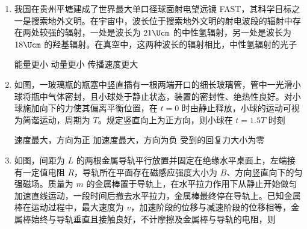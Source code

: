 \documentclass[\gkver]{gaokaozhenti}
\begin{document}
\begin{enumerate}
\item
我国在贵州平塘建成了世界最大单口径球面射电望远镜 FAST，其科学目标之一是搜索地外文明。在宇宙中，波长位于搜索地外文明的射电波段的辐射中存在两处较强的辐射，一处是波长为 $21 \Ucm$ 的中性氢辐射，另一处是波长为 $18 \Ucm$ 的羟基辐射。在真空中，这两种波长的辐射相比，中性氢辐射的光子

{能量更小}
{动量更小}
{传播速度更大}


\item
如图，一玻璃瓶的瓶塞中竖直插有一根两端开口的细长玻璃管，管中一光滑小球将瓶中气体密封，且小球处于静止状态，装置的密封性、绝热性良好。对小球施加向下的力使其偏离平衡位置，在 $t = 0$ 时由静止释放，小球的运动可视为简谐运动，周期为 $T$。规定竖直向上为正方向，则小球在 $t = 1.5T$ 时刻


{速度最大，方向为正}
{加速度最大，方向为负}
{受到的回复力大小为零}


\item
如图，间距为 $L$ 的两根金属导轨平行放置并固定在绝缘水平桌面上，左端接有一定值电阻 $R$，导轨所在平面存在磁感应强度大小为 $B$、方向竖直向下的匀强磁场。质量为 $m$ 的金属棒置于导轨上，在水平拉力作用下从静止开始做匀加速直线运动，一段时间后撤去水平拉力，金属棒最终停在导轨上。已知金属棒在运动过程中，最大速度为 $v$，加速阶段的位移与减速阶段的位移相等，金属棒始终与导轨垂直且接触良好，不计摩擦及金属棒与导轨的电阻，则


\end{enumerate}
\end{document}

